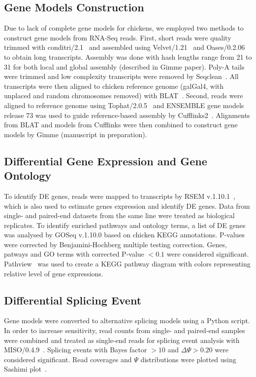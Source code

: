 \documentclass[10pt]{article}
\begin{document}
\subsection{Gene Models Construction}

Due to lack of complete gene models for chickens, we employed two methods to
construct gene models from RNA-Seq reads.  First, short reads were quality
trimmed with conditri/2.1~\cite{} and assembled using Velvet/1.21~\cite{} and
Oases/0.2.06~\cite{} to obtain long transcripts.  Assembly was done with hash
lengths range from 21 to 31 for both local and global assembly (described in
Gimme paper).  Poly-A tails were trimmed and low complexity transcripts were
removed by Seqclean~\cite{}.  All transcripts were then aligned to chicken
reference genome (galGal4, with unplaced and random chromosomes removed) with
BLAT~\cite{}.  Second, reads were aligned to reference genome using
Tophat/2.0.5~\cite{} and ENSEMBLE gene models release 73 was used to guide
reference-based assembly by Cufflinks2~\cite{}.  Alignments from BLAT and models
from Cufflinks were then combined to construct gene models by Gimme (manuscript
in preparation).

\subsection{Differential Gene Expression and Gene Ontology}

To identify DE genes, reads were mapped to transcripts by RSEM
v.1.10.1~\cite{li2011rsem}, which is also used to estimate genes expression and
identify DE genes.  Data from single- and paired-end datasets from the same line
were treated as biological replicates.  To identify enriched pathways and
ontology terms, a list of DE genes was analysed by GOSeq v.1.10.0 based on
chicken KEGG annotations.  P-values were corrected by Benjamini-Hochberg
multiple testing correction.  Genes, patways and GO terms with corrected P-value
$<0.1$ were considered significant.  Pathview~\cite{luo2013pathview} was used to
create a KEGG pathway diagram with colors representing relative level of gene
expressions.

\subsection{Differential Splicing Event}

Gene models were converted to alternative splicing models using a Python script.
In order to increase sensitivity, read counts from single- and paired-end
samples were combined and treated as single-end reads for splicing event
analysis with MISO/0.4.9~\cite{Katz:2010iv}.  Splicing events with Bayes factor
$>10$ and $\Delta\Psi>0.20$ were considered significant.  Read coverages and
$\Psi$ distributions were plotted using Sashimi plot~\cite{Katz:2013vx}.
\end{document}
